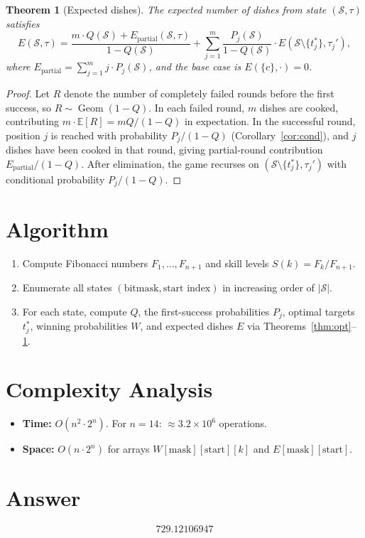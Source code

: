 \documentclass[12pt]{article}
\newtheorem{theorem}{Theorem}
\begin{document}
\begin{theorem}[Expected dishes]\label{thm:exp}
The expected number of dishes from state $(\mathcal{S},\tau)$ satisfies
\[
E(\mathcal{S},\tau) = \frac{m\cdot Q(\mathcal{S}) + E_{\mathrm{partial}}(\mathcal{S},\tau)}{1-Q(\mathcal{S})} + \sum_{j=1}^m \frac{P_j(\mathcal{S})}{1-Q(\mathcal{S})}\cdot E(\mathcal{S}\setminus\{t_j^*\},\tau_j'),
\]
where $E_{\mathrm{partial}} = \sum_{j=1}^m j\cdot P_j(\mathcal{S})$, and the base case is $E(\{c\},\cdot)=0$.
\end{theorem}

\begin{proof}
Let $R$ denote the number of completely failed rounds before the first success, so $R\sim\operatorname{Geom}(1-Q)$. In each failed round, $m$ dishes are cooked, contributing $m\cdot\mathbb{E}[R] = mQ/(1-Q)$ in expectation. In the successful round, position $j$ is reached with probability $P_j/(1-Q)$ (Corollary~\ref{cor:cond}), and $j$ dishes have been cooked in that round, giving partial-round contribution $E_{\mathrm{partial}}/(1-Q)$. After elimination, the game recurses on $(\mathcal{S}\setminus\{t_j^*\},\tau_j')$ with conditional probability $P_j/(1-Q)$.
\end{proof}

\section{Algorithm}
\begin{enumerate}
\item Compute Fibonacci numbers $F_1,\ldots,F_{n+1}$ and skill levels $S(k)=F_k/F_{n+1}$.
\item Enumerate all states $(\text{bitmask},\text{start index})$ in increasing order of $|\mathcal{S}|$.
\item For each state, compute $Q$, the first-success probabilities $P_j$, optimal targets $t_j^*$, winning probabilities $W$, and expected dishes $E$ via Theorems~\ref{thm:opt}--\ref{thm:exp}.
\end{enumerate}

\section{Complexity Analysis}
\begin{itemize}
\item \textbf{Time:} $O(n^2\cdot 2^n)$. For $n=14$: $\approx 3.2\times 10^6$ operations.
\item \textbf{Space:} $O(n\cdot 2^n)$ for arrays $W[\text{mask}][\text{start}][k]$ and $E[\text{mask}][\text{start}]$.
\end{itemize}

\section{Answer}

\[
\boxed{729.12106947}
\]
\end{document}
